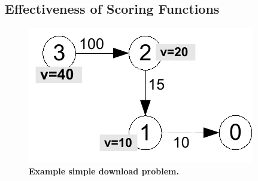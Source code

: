 \subsection{Effectiveness of Scoring Functions}
\label{lance-sec-eval-heuristics}

\begin{figure}[t]
\begin{center}
\includegraphics[width=1.0\hsize]{./4-lance/figs/motivationexample.pdf}
\end{center}

\caption{\textbf{Example simple download problem.}}

\label{lance-fig-simple}
\end{figure}

